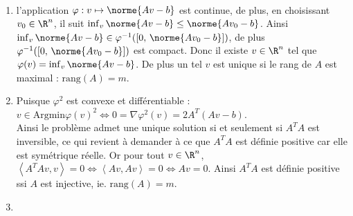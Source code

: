 \documentclass[12pt,a4paper]{article}
\begin{document}
	
	\begin{sol}
		$ $\\
		\begin{minipage}[t]{17cm}
			\begin{enumerate}
				\item l'application $\varphi : v \mapsto \norme{Av-b}$ est continue, de plus, en choisissant $v_0 \in \R^n$, il suit $\inf_v \norme{Av-b} \leq \norme{Av_0-b}$. Ainsi $\inf_v \norme{Av-b} \in \varphi^{-1}([0,\,\norme{Av_0-b}])$, de plus $\varphi^{-1}([0,\,\norme{Av_0-b}])$ est compact. Donc il existe $v \in \R^n$ tel que $\varphi(v) = \inf_v \norme{Av-b}$. De plus un tel $v$ est unique si le rang de $A$ est maximal : $\mathrm{rang}(A) = m$.
				
				\item Puisque $\varphi^2$ est convexe et différentiable : $v \in \mathrm{Argmin} \varphi(v)^2 \iff 0 = \nabla \varphi^2(v) = 2A^T(Av-b)$.\\
				Ainsi le problème admet une unique solution si et seulement si $A^TA$ est inversible, ce qui revient à demander à ce que $A^TA$ est définie positive car elle est symétrique réelle. Or pour tout $v \in \R^n$, $\left<A^TAv,v\right> = 0 \iff \left<Av,Av\right> = 0 \iff Av = 0$. Ainsi $A^TA$ est définie positive ssi $A$ est injective, ie. $\mathrm{rang}(A) = m$.
				
				\item 
			\end{enumerate}
		\end{minipage}
	\end{sol}
	
\end{document}
